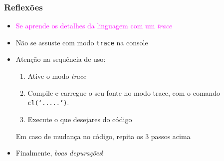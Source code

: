 \begin{frame}[fragile]
\frametitle{Reflexões}

\begin{itemize}
  \item \textcolor{magenta}{Se aprende os detalhes da linguagem com um \textit{trace}}
  
  \pause
    \item Não se assuste com modo \texttt{trace} na console
  
  
  \pause
    \item Atenção na sequência de uso: 
    
    \begin{enumerate}
      \item Ative o modo \textit{trace}
      \item Compile e carregue o seu fonte no modo trace, com o comando \texttt{cl(`.....')}.
      \item Execute o que desejares do código

    \end{enumerate}
    \pause
    Em caso de mudança no código, repita os 3 passos acima
    
\pause
    \item Finalmente, \textit{boas depurações}!        
  
\end{itemize}


\end{frame}
